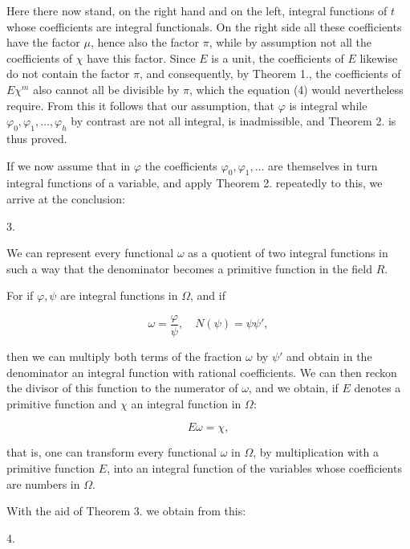 
Here there now stand, on the right hand and on the left, integral functions of $t$ whose coefficients are integral functionals. On the right side all these coefficients have the factor $\mu$, hence also the factor $\pi$, while by assumption not all the coefficients of $\chi$ have this factor. Since $E$ is a unit, the coefficients of $E$ likewise do not contain the factor $\pi$, and consequently, by Theorem 1., the coefficients of $E\chi^m$ also cannot all be divisible by $\pi$, which the equation (4) would nevertheless require. From this it follows that our assumption, that $\varphi$ is integral while $\varphi_0, \varphi_1, \ldots, \varphi_h$ by contrast are not all integral, is inadmissible, and Theorem 2. is thus proved.

If we now assume that in $\varphi$ the coefficients $\varphi_0, \varphi_1, \ldots$ are themselves in turn integral functions of a variable, and apply Theorem 2. repeatedly to this, we arrive at the conclusion:

3. 

We can represent every functional $\omega$ as a quotient of two integral functions in such a way that the denominator becomes a primitive function in the field $R$.

For if $\varphi, \psi$ are integral functions in $\Omega$, and if

\[
\omega = \frac{\varphi}{\psi}, \quad N(\psi) = \psi\psi',
\]

then we can multiply both terms of the fraction $\omega$ by $\psi'$ and obtain in the denominator an integral function with rational coefficients. We can then reckon the divisor of this function to the numerator of $\omega$, and we obtain, if $E$ denotes a primitive function and $\chi$ an integral function in $\Omega$:

\[
E\omega = \chi,
\]

that is, one can transform every functional $\omega$ in $\Omega$, by multiplication with a primitive function $E$, into an integral function of the variables whose coefficients are numbers in $\Omega$.

With the aid of Theorem 3. we obtain from this:

4. 
